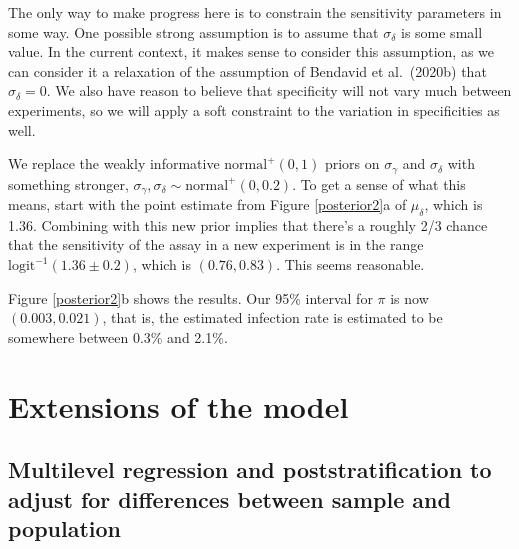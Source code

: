 \documentclass[11pt]{article}
\begin{document}
The only way to make progress here is to constrain the sensitivity parameters in some way.  One possible strong assumption is to assume that $\sigma_{\delta}$ is some small value. In the current context, it makes sense to consider this assumption, as we can consider it a relaxation of the assumption of Bendavid et al.\ (2020b) that $\sigma_{\delta} = 0$.  We also have reason to believe that specificity will not vary much between experiments, so we will apply a soft constraint to the variation in specificities as well.

We replace the weakly informative $\mbox{normal}^+(0, 1)$ priors on $\sigma_{\gamma}$ and $\sigma_{\delta}$ with something stronger,
$\sigma_{\gamma}, \sigma_{\delta}\sim\mbox{normal}^+(0, 0.2)$.  To get a sense of what this means, start with the point estimate from Figure \ref{posterior2}a of $\mu_{\delta}$, which is 1.36. Combining with this new prior implies that there's a roughly 2/3 chance that the sensitivity of the assay in a new experiment is in the range $\mbox{logit}^{-1}(1.36 \pm 0.2)$, which is $(0.76, 0.83)$. This seems reasonable.

Figure \ref{posterior2}b shows the results.  Our 95\% interval for $\pi$ is now $(0.003, 0.021)$, that is, the estimated infection rate is estimated to be somewhere between 0.3\% and 2.1\%.


 \section{Extensions of the model}

\subsection{Multilevel regression and poststratification to adjust for differences between sample and population}\label{mrp}
\end{document}
